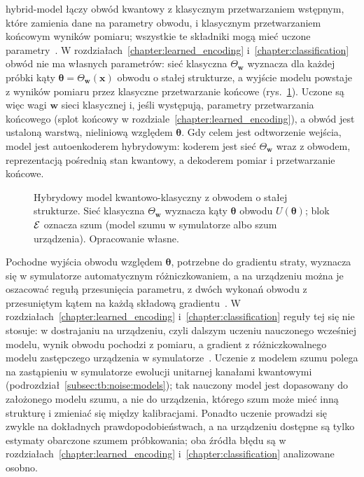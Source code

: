 \Gls{hybrid-model} łączy obwód kwantowy z klasycznym przetwarzaniem wstępnym, które zamienia dane na parametry obwodu, i klasycznym przetwarzaniem końcowym wyników pomiaru; wszystkie te składniki mogą mieć uczone parametry~\cite{benedetti2019vqc,mitarai_quantum_2018}.
W rozdziałach~\ref{chapter:learned_encoding} i~\ref{chapter:classification} obwód nie ma własnych parametrów: sieć klasyczna $\Theta_{\mathbf{w}}$ wyznacza dla każdej próbki kąty $\boldsymbol{\theta}=\Theta_{\mathbf{w}}(\mathbf{x})$ obwodu o stałej strukturze, a wyjście modelu powstaje z wyników pomiaru przez klasyczne przetwarzanie końcowe (rys.~\ref{fig:tb:ml:hybrid}).
Uczone są więc wagi $\mathbf{w}$ sieci klasycznej i, jeśli występują, parametry przetwarzania końcowego (splot końcowy w rozdziale~\ref{chapter:learned_encoding}), a obwód jest ustaloną warstwą, nieliniową względem $\boldsymbol{\theta}$.
Gdy celem jest odtworzenie wejścia, model jest autoenkoderem hybrydowym: koderem jest sieć $\Theta_{\mathbf{w}}$ wraz z obwodem, reprezentacją pośrednią stan kwantowy, a dekoderem pomiar i przetwarzanie końcowe.

\begin{figure}[htb]
\centering

\caption[Hybrydowy model kwantowo-klasyczny z obwodem o stałej strukturze]{Hybrydowy model kwantowo-klasyczny z obwodem o stałej strukturze.
Sieć klasyczna $\Theta_{\mathbf{w}}$ wyznacza kąty $\boldsymbol{\theta}$ obwodu $U(\boldsymbol{\theta})$; blok $\mathcal{E}$ oznacza szum (model szumu w symulatorze albo szum urządzenia).
Opracowanie własne.}
\label{fig:tb:ml:hybrid}
\end{figure}

Pochodne wyjścia obwodu względem $\boldsymbol{\theta}$, potrzebne do gradientu straty, wyznacza się w symulatorze automatycznym różniczkowaniem, a na urządzeniu można je oszacować regułą przesunięcia parametru, z dwóch wykonań obwodu z przesuniętym kątem na każdą składową gradientu~\cite{mitarai_quantum_2018,schuld_evaluating_2019}.
W rozdziałach~\ref{chapter:learned_encoding} i~\ref{chapter:classification} reguły tej się nie stosuje: w dostrajaniu na urządzeniu, czyli dalszym uczeniu nauczonego wcześniej modelu, wynik obwodu pochodzi z pomiaru, a gradient z różniczkowalnego modelu zastępczego urządzenia w symulatorze~\cite{wright_deep_2022}.
Uczenie z modelem szumu polega na zastąpieniu w symulatorze ewolucji unitarnej kanałami kwantowymi (podrozdział~\ref{subsec:tb:noise:models}); tak nauczony model jest dopasowany do założonego modelu szumu, a nie do urządzenia, którego szum może mieć inną strukturę i zmieniać się między kalibracjami.
Ponadto uczenie prowadzi się zwykle na dokładnych prawdopodobieństwach, a na urządzeniu dostępne są tylko estymaty obarczone szumem próbkowania; oba źródła błędu są w rozdziałach~\ref{chapter:learned_encoding} i~\ref{chapter:classification} analizowane osobno.

